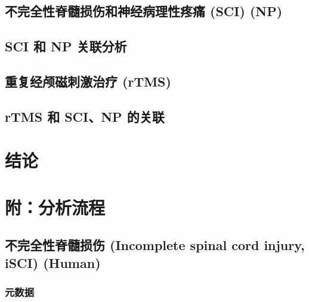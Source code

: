 \documentclass[
]{article}
\begin{document}
\hypertarget{ux4e0dux5b8cux5168ux6027ux810aux9ad3ux635fux4f24ux548cux795eux7ecfux75c5ux7406ux6027ux75bcux75db-sci-np}{%
\subsection{不完全性脊髓损伤和神经病理性疼痛 (SCI) (NP)}\label{ux4e0dux5b8cux5168ux6027ux810aux9ad3ux635fux4f24ux548cux795eux7ecfux75c5ux7406ux6027ux75bcux75db-sci-np}}

\hypertarget{sci-ux548c-np-ux5173ux8054ux5206ux6790}{%
\subsection{SCI 和 NP 关联分析}\label{sci-ux548c-np-ux5173ux8054ux5206ux6790}}

\hypertarget{ux91cdux590dux7ecfux9885ux78c1ux523aux6fc0ux6cbbux7597-rtms}{%
\subsection{重复经颅磁刺激治疗 (rTMS)}\label{ux91cdux590dux7ecfux9885ux78c1ux523aux6fc0ux6cbbux7597-rtms}}

\hypertarget{rtms-ux548c-scinp-ux7684ux5173ux8054}{%
\subsection{rTMS 和 SCI、NP 的关联}\label{rtms-ux548c-scinp-ux7684ux5173ux8054}}

\hypertarget{dis}{%
\section{结论}\label{dis}}

\hypertarget{workflow}{%
\section{附：分析流程}\label{workflow}}

\hypertarget{ux4e0dux5b8cux5168ux6027ux810aux9ad3ux635fux4f24-incomplete-spinal-cord-injury-isci-human}{%
\subsection{不完全性脊髓损伤 (Incomplete spinal cord injury, iSCI) (Human)}\label{ux4e0dux5b8cux5168ux6027ux810aux9ad3ux635fux4f24-incomplete-spinal-cord-injury-isci-human}}

\hypertarget{ux5143ux6570ux636e}{%
\subsubsection{元数据}\label{ux5143ux6570ux636e}}
\end{document}
